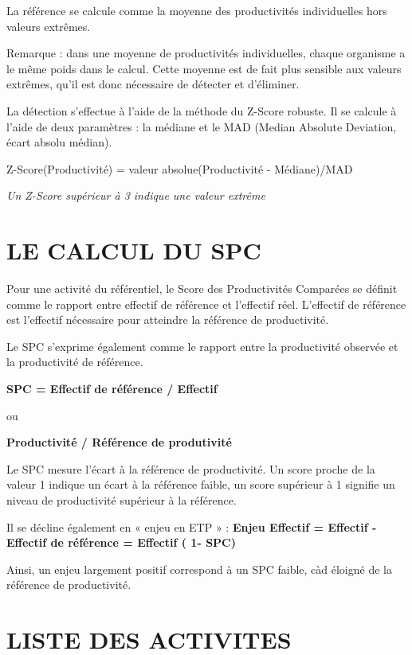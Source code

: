 \documentclass[
]{book}
\begin{document}
La référence se calcule comme la moyenne des productivités individuelles hors valeurs extrêmes.

Remarque : dans une moyenne de productivités individuelles, chaque organisme a le même poids dans le calcul. Cette moyenne est de fait plus sensible aux valeurs extrêmes, qu'il est donc nécessaire de détecter et d'éliminer.

La détection s'effectue à l'aide de la méthode du Z-Score robuste.
Il se calcule à l'aide de deux paramètres : la médiane et le MAD (Median Absolute Deviation, écart absolu médian).

Z-Score(Productivité) = valeur absolue(Productivité - Médiane)/MAD

\emph{Un Z-Score supérieur à 3 indique une valeur extrême}

\hypertarget{le-calcul-du-spc-7}{%
\section{LE CALCUL DU SPC}\label{le-calcul-du-spc-7}}

Pour une activité du référentiel, le Score des Productivités Comparées se définit comme le rapport entre effectif de référence et l'effectif réel. L'effectif de référence est l'effectif nécessaire pour atteindre la référence de productivité.

Le SPC s'exprime également comme le rapport entre la productivité observée et la productivité de référence.

\textbf{SPC = Effectif de référence / Effectif}

ou

\textbf{Productivité / Référence de produtivité}

Le SPC mesure l'écart à la référence de productivité. Un score proche de la valeur 1 indique un écart à la référence faible, un score supérieur à 1 signifie un niveau de productivité supérieur à la référence.

Il se décline également en « enjeu en ETP » :
\textbf{Enjeu Effectif = Effectif - Effectif de référence = Effectif ( 1- SPC)}

Ainsi, un enjeu largement positif correspond à un SPC faible, càd éloigné de la référence de productivité.

\hypertarget{liste-des-activites-4}{%
\section{LISTE DES ACTIVITES}\label{liste-des-activites-4}}
\end{document}
